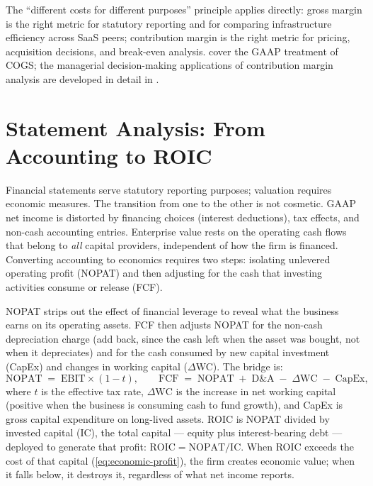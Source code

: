 The ``different costs for different purposes'' principle \parencite{datar2025horngrens}
applies directly: gross margin is the right metric for statutory reporting and for comparing
infrastructure efficiency across SaaS peers; contribution margin is the right metric for
pricing, acquisition decisions, and break-even analysis. \textcite{weygandt2019financial}
cover the GAAP treatment of COGS; the managerial decision-making applications of contribution
margin analysis are developed in detail in \textcite{datar2025horngrens}.

\section{Statement Analysis: From Accounting to ROIC}\label{sec:statement-analysis}

Financial statements serve statutory reporting purposes; valuation requires economic measures.
The transition from one to the other is not cosmetic. GAAP net income is distorted by
financing choices (interest deductions), tax effects, and non-cash accounting entries.
Enterprise value rests on the operating cash flows that belong to \emph{all} capital
providers, independent of how the firm is financed. Converting accounting to economics
requires two steps: isolating unlevered operating profit (NOPAT) and then adjusting for the
cash that investing activities consume or release (FCF).

NOPAT strips out the effect of financial leverage to reveal what the business earns on its
operating assets. FCF then adjusts NOPAT for the non-cash depreciation charge (add back,
since the cash left when the asset was bought, not when it depreciates) and for the cash
consumed by new capital investment (CapEx) and changes in working capital (\(\Delta\)WC).
The bridge is:
\begin{equation}\label{eq:nopat-bridge}
  \mathrm{NOPAT} \;=\; \mathrm{EBIT} \times (1 - t),
  \qquad
  \mathrm{FCF} \;=\; \mathrm{NOPAT} \;+\; \mathrm{D\&A} \;-\; \Delta\mathrm{WC} \;-\; \mathrm{CapEx},
\end{equation}
where \(t\) is the effective tax rate, \(\Delta\mathrm{WC}\) is the increase in net working
capital (positive when the business is consuming cash to fund growth), and CapEx is gross
capital expenditure on long-lived assets. ROIC is NOPAT divided by invested capital (IC),
the total capital --- equity plus interest-bearing debt --- deployed to generate that profit:
\(\mathrm{ROIC} = \mathrm{NOPAT} / \mathrm{IC}\). When ROIC exceeds the cost of that
capital (\cref{eq:economic-profit}), the firm creates economic value; when it falls below,
it destroys it, regardless of what net income reports.


